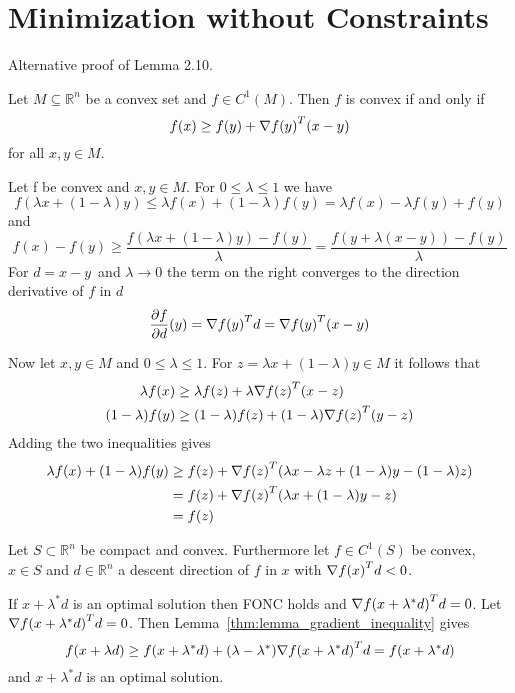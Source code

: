 
\newpage
\section{Minimization without Constraints}

Alternative proof of Lemma 2.10.

\lemma{}\label{thm:lemma_gradient_inequality}
Let \(M \subseteq \mathbb{R}^n\) be a convex set and \(f \in C^1(M)\). Then \(f\) is convex if and only if
\[
    f(x) \ge f(y) + \nabla {f(y)}^T (x - y)
\]  
for all \(x, y \in M \). 

\proof{}
Let f be convex and \(x, y \in M\). For \( 0 \le \lambda \le 1 \) we have
\[ 
    f(\lambda x + (1 - \lambda) y) \le \lambda f(x) + (1 - \lambda)f(y) =  \lambda f(x) - \lambda f(y) + f(y) 
\] 
and 
\[ 
    f(x) - f(y) \ge \frac{f(\lambda x + (1 - \lambda) y) - f(y)}{\lambda}
        = \frac{f(y + \lambda (x - y)) - f(y)}{\lambda}
\]
For \( d = x - y \)\ and \( \lambda \to 0 \) the term on the right converges to the direction derivative of \( f \)
in \( d \)
\[
    \frac{\partial f}{\partial d}(y) = \nabla{f(y)}^T d = \nabla{f(y)}^T (x - y) 
\]

Now let \( x, y \in M \) and  \( 0 \le \lambda \le 1 \). For \( z = \lambda x + (1 - \lambda) y \in M \) it follows that
\[
    \begin{split}
        \lambda f(x) & \ge \lambda f(z) + \lambda \nabla {f(z)}^T (x - z) \\
            (1 - \lambda) f(y) & \ge (1 - \lambda) f(z) + (1 - \lambda) \nabla {f(z)}^T (y - z)
    \end{split}
\]
Adding the two inequalities gives
\[
    \begin{split}
       \lambda f(x) + (1 - \lambda) f(y) 
            & \ge f(z) + \nabla {f(z)}^T(\lambda x - \lambda z + (1- \lambda) y - (1-\lambda)z) \\
            & = f(z) + \nabla {f(z)}^T(\lambda x + (1- \lambda) y - z) \\
            & = f(z)
    \end{split}
\]


\exercise{}
Let \( S \subset \mathbb{R}^n \) be compact and convex. Furthermore let \( f \in C^1(S) \) be convex,
\( x \in S \) and \( d \in \mathbb{R}^n \) a descent direction of \( f \) in \( x \) 
with \( \nabla {f(x)}^T d < 0 \).

\proof{}
If  \( x + \lambda^* d \) is an optimal solution then FONC holds and \( \nabla {f(x + \lambda^* d)}^T d = 0 \).
Let \( \nabla {f(x + \lambda^* d)}^T d = 0 \). Then Lemma~\ref{thm:lemma_gradient_inequality} gives 
\[
    f(x + \lambda d) \ge f(x + \lambda^* d) + (\lambda - \lambda^*) \nabla {f(x + \lambda^* d)}^T d 
        = f(x + \lambda^* d) 
\]
and \( x + \lambda^* d \) is an optimal solution.

